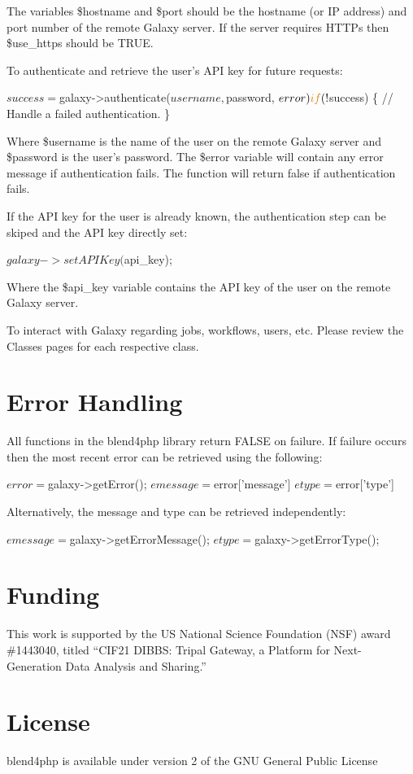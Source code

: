 The variables \$hostname and \$port should be the hostname (or I\-P address) and port number of the remote Galaxy server. If the server requires H\-T\-T\-Ps then \$use\-\_\-https should be T\-R\-U\-E.

To authenticate and retrieve the user's A\-P\-I key for future requests\-:


\begin{DoxyCode}
$success = $galaxy->authenticate($username, $password, $error)
\textcolor{keywordflow}{if} (!$success) \{
  \textcolor{comment}{// Handle a failed authentication.}
\}
\end{DoxyCode}


Where \$username is the name of the user on the remote Galaxy server and \$password is the user's password. The \$error variable will contain any error message if authentication fails. The function will return false if authentication fails.

If the A\-P\-I key for the user is already known, the authentication step can be skiped and the A\-P\-I key directly set\-:


\begin{DoxyCode}
$galaxy->setAPIKey($api\_key);
\end{DoxyCode}


Where the \$api\-\_\-key variable contains the A\-P\-I key of the user on the remote Galaxy server.

To interact with Galaxy regarding jobs, workflows, users, etc. Please review the Classes pages for each respective class.\hypertarget{index_error_sec}{}\section{Error Handling}\label{index_error_sec}
All functions in the blend4php library return F\-A\-L\-S\-E on failure. If failure occurs then the most recent error can be retrieved using the following\-:


\begin{DoxyCode}
$error = $galaxy->getError();
$emessage = $error[\textcolor{stringliteral}{'message'}]
$etype = $error[\textcolor{stringliteral}{'type'}]
\end{DoxyCode}


Alternatively, the message and type can be retrieved independently\-:


\begin{DoxyCode}
$emessage = $galaxy->getErrorMessage();
$etype = $galaxy->getErrorType();
\end{DoxyCode}
\hypertarget{index_funding_sec}{}\section{Funding}\label{index_funding_sec}
This work is supported by the U\-S National Science Foundation (N\-S\-F) award \#1443040, titled “\-C\-I\-F21 D\-I\-B\-B\-S\-: Tripal Gateway, a Platform for Next-\/\-Generation Data Analysis and Sharing.\-”\hypertarget{index_license_sec}{}\section{License}\label{index_license_sec}
blend4php is available under version 2 of the G\-N\-U General Public License 
